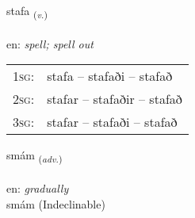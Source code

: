 \documentclass[frontgrid, backgrid]{flacards}\usepackage[]{graphicx}\usepackage[]{color}
\begin{document}
\renewcommand{\flhead}{\vskip5pt \fboxsep=0pt {\small\bfseries\footnotesize Sagnorð | Verb}}
\renewcommand{\fcfoot}{\vskip5pt \fboxsep=0pt \hspace{2pt}{\small\bfseries\footnotesize 2K}}

\renewcommand{\blhead}{\vskip5pt {\small\bfseries\footnotesize Sagnorð | Verb }}
\renewcommand{\bcfoot}{\vskip5pt \hspace{2pt}{\small\bfseries\footnotesize 2K}}


{stafa \small{\textsubscript{(\textit{v.})}} \\[1ex] %
\textphonetic{[staːva]} \\
en: \emph{spell; spell out} \\  [2ex]
\renewcommand*{\arraystretch}{0.8}
\begin{tabular}{p{1cm}l}
\textsc{1sg}: & stafa -- stafaði -- stafað \\ 
\textsc{2sg}: & stafar -- stafaðir -- stafað \\ 
\textsc{3sg}: & stafar -- stafaði -- stafað \\ 
\end{tabular}
}


\renewcommand{\flhead}{\vskip5pt \fboxsep=0pt {\small\bfseries\footnotesize Atviksorð | Adverb}}
\renewcommand{\fcfoot}{\vskip5pt \fboxsep=0pt \hspace{2pt}{\small\bfseries\footnotesize 2K}}

\renewcommand{\blhead}{\vskip5pt {\small\bfseries\footnotesize Atviksorð | Adverb }}
\renewcommand{\bcfoot}{\vskip5pt \hspace{2pt}{\small\bfseries\footnotesize 2K}}


{smám \small{\textsubscript{(\textit{adv.})}} \\[1ex]
\textphonetic{[smauːm]} \\
en: \emph{gradually} \\  [2ex]
smám (Indeclinable)}

\renewcommand{\flhead}{\vskip5pt \fboxsep=0pt {\small\bfseries\footnotesize Lýsingarorð | Adjective}}
\renewcommand{\fcfoot}{\vskip5pt \fboxsep=0pt \hspace{2pt}{\small\bfseries\footnotesize 2K}}
\end{document}
